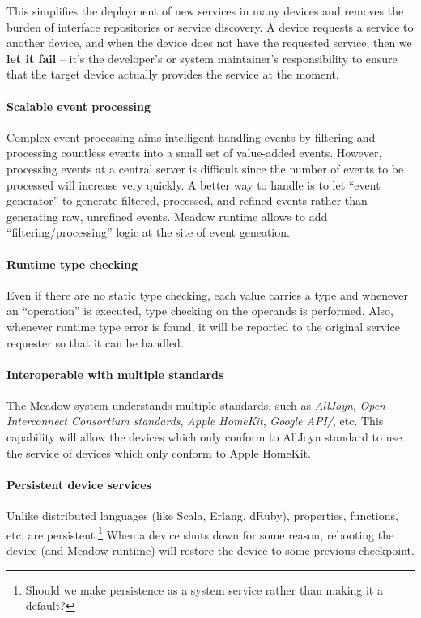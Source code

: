 \documentclass{note}
\begin{document}
This
simplifies the deployment of new services in many devices and removes
the burden of interface repositories or service discovery. 
A device requests a service to another device, and when the device does not
have the requested service, then we \textcolor{blue2}{\bf{}let it fail} --
it's the developer's or system maintainer's responsibility to ensure that the
target device actually provides the service at the moment. 

\paragraph{Scalable event processing}
Complex event processing aims intelligent handling events by filtering and
processing countless events into a small set of value-added events.
However, processing events at a central server is difficult since the number
of events to be processed will increase very quickly. A better way to handle
is to let ``event generator'' to generate filtered, processed, and refined
events rather than generating raw, unrefined events. Meadow runtime allows to
add ``filtering/processing'' logic at the site of event geneation.

\paragraph{Runtime type checking}
Even if there are no static type checking, each value carries a type and
whenever an ``operation'' is executed, type checking on the operands is
performed. Also, whenever runtime type error is found, it will be reported to
the original service requester so that it can be handled.


\paragraph{Interoperable with multiple standards}
The Meadow system understands multiple standards, such as 
{\em AllJoyn\/}, {\em Open Interconnect
Consortium standards\/},  {\em Apple HomeKit\/}, {\em Google API/}, etc.
This capability will allow the devices which only conform to AllJoyn standard
to use the service of devices which only conform to Apple HomeKit. 

\paragraph{Persistent device services}
Unlike distributed languages (like Scala, Erlang, dRuby), properties,
   functions, etc. are persistent.\footnote{\textcolor{green2}{Should we make
       persistence as a system service rather than making it a default?}} 
   When a device shuts down for some reason, rebooting the device (and Meadow
   runtime) will restore the device to some previous checkpoint.
\end{document}
